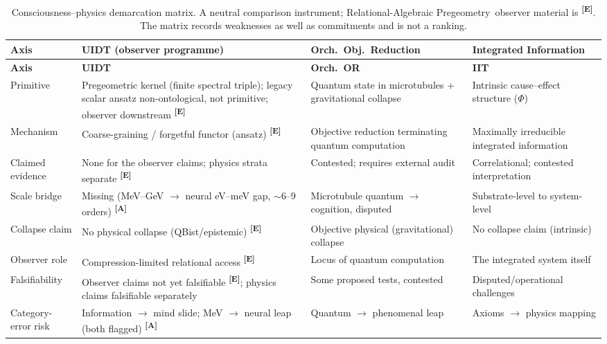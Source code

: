 \documentclass[12pt,a4paper,twoside]{article}
\theoremstyle{plain}
\theoremstyle{definition}
\theoremstyle{remark}
\newcommand{\ProjectShort}{Relational-Algebraic Pregeometry}
\newcommand{\RAP}{\ProjectShort}
\newcommand{\catmark}[1]{\textsuperscript{\textsf{\textbf{[#1]}}}}
\begin{document}
{\small
\renewcommand{\arraystretch}{1.3}
\begin{longtable}{p{} p{} p{} p{}}
\caption{Consciousness--physics demarcation matrix. A neutral comparison
instrument; \RAP\ observer material is \catmark{E}. The matrix records
weaknesses as well as commitments and is not a ranking.}
\label{tab:demarcation-matrix}\\
\toprule
\textbf{Axis} & \textbf{UIDT (observer programme)} & \textbf{Orch.\ Obj.\ Reduction} &
\textbf{Integrated Information} \\
\midrule
\endfirsthead
\toprule
\textbf{Axis} & \textbf{UIDT} & \textbf{Orch.\ OR} & \textbf{IIT} \\
\midrule
\endhead
\bottomrule
\endfoot
Primitive & Pregeometric kernel (finite spectral triple); legacy scalar ansatz non-ontological,
not primitive; observer downstream \catmark{E} & Quantum state in
microtubules + gravitational collapse & Intrinsic cause--effect structure
($\Phi$) \\
Mechanism & Coarse-graining / forgetful functor (ansatz) \catmark{E} &
Objective reduction terminating quantum computation & Maximally irreducible
integrated information \\
Claimed evidence & None for the observer claims; physics strata separate
\catmark{E} & Contested; requires external audit & Correlational; contested
interpretation \\
Scale bridge & Missing (MeV--GeV $\to$ neural eV--meV gap, $\sim$6--9
orders) \catmark{A} & Microtubule quantum $\to$ cognition, disputed &
Substrate-level to system-level \\
Collapse claim & No physical collapse (QBist/epistemic) \catmark{E} &
Objective physical (gravitational) collapse & No collapse claim (intrinsic) \\
Observer role & Compression-limited relational access \catmark{E} & Locus of
quantum computation & The integrated system itself \\
Falsifiability & Observer claims not yet falsifiable \catmark{E}; physics
claims falsifiable separately & Some proposed tests, contested &
Disputed/operational challenges \\
Category-error risk & Information $\to$ mind slide; MeV $\to$ neural leap
(both flagged) \catmark{A} & Quantum $\to$ phenomenal leap & Axioms $\to$
physics mapping \\
\bottomrule
\end{longtable}
}
\end{document}
